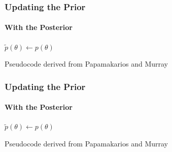 \documentclass[9pt, aspectratio=169]{beamer}
\begin{document}
\begin{frame}
\frametitle{Updating the Prior}
\framesubtitle{With the Posterior}
\begin{algorithm}[H]
	$\tilde{p}(\theta) \leftarrow p(\theta)$\\
\end{algorithm}
\vspace{35pt}
\tiny Pseudocode derived from Papamakarios and Murray \cite{papamakarios2016fast}
\end{frame} 
\begin{frame}
\frametitle{Updating the Prior}
\framesubtitle{With the Posterior}
\begin{algorithm}[H]
	$\tilde{p}(\theta) \leftarrow p(\theta)$\\
\end{algorithm}
\vspace{35pt}
\tiny Pseudocode derived from Papamakarios and Murray \cite{papamakarios2016fast}
\end{frame} 
\end{document}
